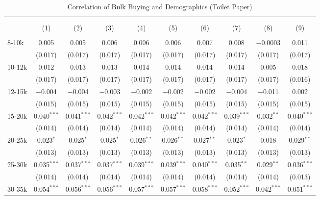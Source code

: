 
\begin{table}[!htbp] \centering 
  \caption{Correlation of Bulk Buying and Demographics (Toilet Paper)} 
  \label{tab:discountingBehavior7270} 
\begin{tabular}{@{\extracolsep{5pt}}lccccccccc} 
\\[-1.8ex]\hline 
\hline \\[-1.8ex] 
\\[-1.8ex] & (1) & (2) & (3) & (4) & (5) & (6) & (7) & (8) & (9)\\ 
\hline \\[-1.8ex] 
 8-10k & 0.005 & 0.005 & 0.006 & 0.006 & 0.006 & 0.007 & 0.008 & $-$0.0003 & 0.011 \\ 
  & (0.017) & (0.017) & (0.017) & (0.017) & (0.017) & (0.017) & (0.017) & (0.017) & (0.017) \\ 
  10-12k & 0.012 & 0.013 & 0.013 & 0.014 & 0.014 & 0.014 & 0.014 & 0.005 & 0.018 \\ 
  & (0.017) & (0.017) & (0.017) & (0.017) & (0.017) & (0.017) & (0.017) & (0.017) & (0.016) \\ 
  12-15k & $-$0.004 & $-$0.004 & $-$0.003 & $-$0.002 & $-$0.002 & $-$0.002 & $-$0.004 & $-$0.011 & 0.002 \\ 
  & (0.015) & (0.015) & (0.015) & (0.015) & (0.015) & (0.015) & (0.015) & (0.015) & (0.015) \\ 
  15-20k & 0.040$^{***}$ & 0.041$^{***}$ & 0.042$^{***}$ & 0.042$^{***}$ & 0.042$^{***}$ & 0.042$^{***}$ & 0.039$^{***}$ & 0.032$^{**}$ & 0.040$^{***}$ \\ 
  & (0.014) & (0.014) & (0.014) & (0.014) & (0.014) & (0.014) & (0.014) & (0.014) & (0.014) \\ 
  20-25k & 0.023$^{*}$ & 0.025$^{*}$ & 0.025$^{*}$ & 0.026$^{**}$ & 0.026$^{**}$ & 0.027$^{**}$ & 0.023$^{*}$ & 0.018 & 0.029$^{**}$ \\ 
  & (0.013) & (0.013) & (0.013) & (0.013) & (0.013) & (0.013) & (0.013) & (0.013) & (0.013) \\ 
  25-30k & 0.035$^{***}$ & 0.037$^{***}$ & 0.037$^{***}$ & 0.039$^{***}$ & 0.039$^{***}$ & 0.040$^{***}$ & 0.035$^{**}$ & 0.029$^{**}$ & 0.036$^{***}$ \\ 
  & (0.014) & (0.014) & (0.014) & (0.014) & (0.014) & (0.014) & (0.014) & (0.014) & (0.013) \\ 
  30-35k & 0.054$^{***}$ & 0.056$^{***}$ & 0.056$^{***}$ & 0.057$^{***}$ & 0.057$^{***}$ & 0.058$^{***}$ & 0.052$^{***}$ & 0.042$^{***}$ & 0.051$^{***}$ \\ 

\end{tabular}
\end{table}
